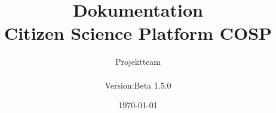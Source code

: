 \documentclass[11pt,headsepline,a4paper]{scrreprt}
\begin{document}
\setcounter{tocdepth}{3}
\title{Dokumentation  \\ \normalsize{Citizen Science Platform {\glqq COSP\grqq}} }
\date{\today}
\author{Projektteam \\
	\normalsize{
		\begin{tabular}[t]{ll}
			Version:  & \quad Beta 1.5.0 \\[1.2ex]
		\end{tabular}
	}
}
\maketitle

\newpage
\tableofcontents
\thispagestyle{empty}
\newpage
\setcounter{page}{1}









\end{document}
